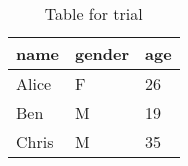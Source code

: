 \documentclass{article}
\begin{document}
\begin{table}[h!]
  \centering
  \caption{Table for trial}
  \label{tab:table1}
  \begin{tabular}{lll}                    %
    \toprule
    name & gender & age\\
    \midrule
    Alice & F & 26\\
    Ben & M & 19\\
    Chris & M & 35\\
    \bottomrule
  \end{tabular}
\end{table}
\end{document}
